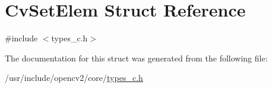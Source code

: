 \hypertarget{structCvSetElem}{\section{Cv\-Set\-Elem Struct Reference}
\label{structCvSetElem}
}


{\ttfamily \#include $<$types\-\_\-c.\-h$>$}



The documentation for this struct was generated from the following file\-:\begin{DoxyCompactItemize}
\item 
/usr/include/opencv2/core/\hyperlink{core_2types__c_8h}{types\-\_\-c.\-h}\end{DoxyCompactItemize}
